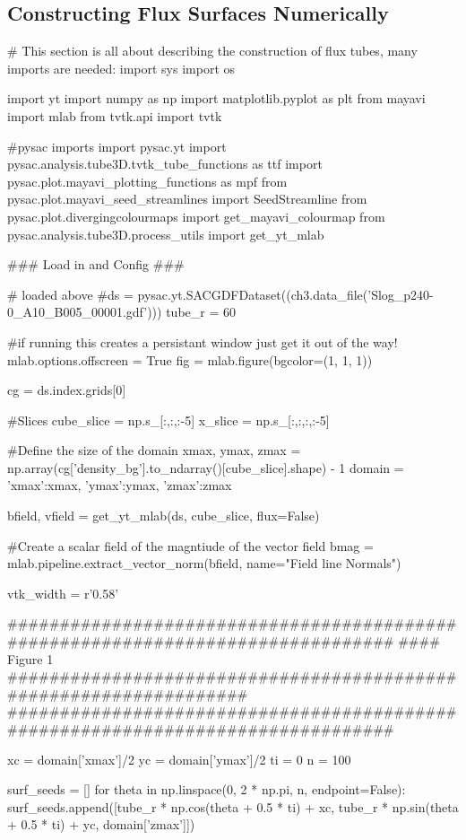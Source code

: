 \subsection{Constructing Flux Surfaces Numerically}
\begin{pycode}[chapter3a]

# This section is all about describing the construction of flux tubes, many imports are needed:
import sys
import os

import yt
import numpy as np
import matplotlib.pyplot as plt
from mayavi import mlab
from tvtk.api import tvtk

#pysac imports
import pysac.yt
import pysac.analysis.tube3D.tvtk_tube_functions as ttf
import pysac.plot.mayavi_plotting_functions as mpf
from pysac.plot.mayavi_seed_streamlines import SeedStreamline
from pysac.plot.divergingcolourmaps import get_mayavi_colourmap
from pysac.analysis.tube3D.process_utils import get_yt_mlab

### Load in and Config ###

# loaded above
#ds = pysac.yt.SACGDFDataset((ch3.data_file('Slog_p240-0_A10_B005_00001.gdf')))
tube_r = 60

#if running this creates a persistant window just get it out of the way!
mlab.options.offscreen = True
fig = mlab.figure(bgcolor=(1, 1, 1))

cg = ds.index.grids[0]

#Slices
cube_slice = np.s_[:,:,:-5]
x_slice = np.s_[:,:,:,:-5]

#Define the size of the domain
xmax, ymax, zmax = np.array(cg['density_bg'].to_ndarray()[cube_slice].shape) - 1
domain = {'xmax':xmax, 'ymax':ymax, 'zmax':zmax}

bfield, vfield = get_yt_mlab(ds, cube_slice, flux=False)

#Create a scalar field of the magntiude of the vector field
bmag = mlab.pipeline.extract_vector_norm(bfield, name="Field line Normals")

vtk_width = r'0.58\columnwidth'

################################################################################
#### Figure 1 ##################################################################
################################################################################

xc = domain['xmax']/2
yc = domain['ymax']/2
ti = 0
n = 100

surf_seeds = []
for theta in np.linspace(0, 2 * np.pi, n, endpoint=False):
    surf_seeds.append([tube_r * np.cos(theta + 0.5 * ti) + xc,
    tube_r * np.sin(theta + 0.5 * ti) + yc, domain['zmax']])


\end{pycode}

